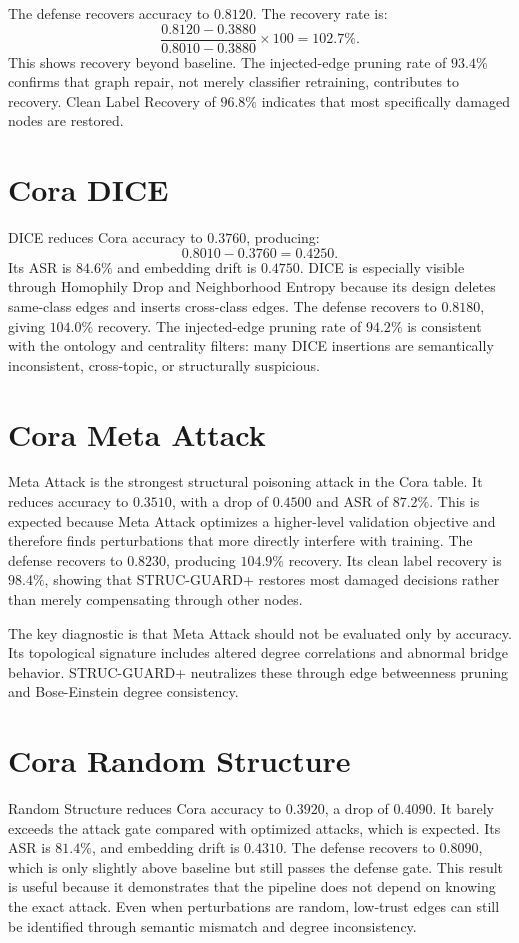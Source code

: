 \documentclass[12pt,oneside]{report}
\begin{document}
The defense recovers accuracy to $0.8120$. The recovery rate is:
$$
\frac{0.8120-0.3880}{0.8010-0.3880}\times 100=102.7\%.
$$
This shows recovery beyond baseline. The injected-edge pruning rate of $93.4\%$ confirms that graph repair, not merely classifier retraining, contributes to recovery. Clean Label Recovery of $96.8\%$ indicates that most specifically damaged nodes are restored.

\section{Cora DICE}
DICE reduces Cora accuracy to $0.3760$, producing:
$$
0.8010-0.3760=0.4250.
$$
Its ASR is $84.6\%$ and embedding drift is $0.4750$. DICE is especially visible through Homophily Drop and Neighborhood Entropy because its design deletes same-class edges and inserts cross-class edges. The defense recovers to $0.8180$, giving $104.0\%$ recovery. The injected-edge pruning rate of $94.2\%$ is consistent with the ontology and centrality filters: many DICE insertions are semantically inconsistent, cross-topic, or structurally suspicious.

\section{Cora Meta Attack}
Meta Attack is the strongest structural poisoning attack in the Cora table. It reduces accuracy to $0.3510$, with a drop of $0.4500$ and ASR of $87.2\%$. This is expected because Meta Attack optimizes a higher-level validation objective and therefore finds perturbations that more directly interfere with training. The defense recovers to $0.8230$, producing $104.9\%$ recovery. Its clean label recovery is $98.4\%$, showing that STRUC-GUARD+ restores most damaged decisions rather than merely compensating through other nodes.

The key diagnostic is that Meta Attack should not be evaluated only by accuracy. Its topological signature includes altered degree correlations and abnormal bridge behavior. STRUC-GUARD+ neutralizes these through edge betweenness pruning and Bose-Einstein degree consistency.

\section{Cora Random Structure}
Random Structure reduces Cora accuracy to $0.3920$, a drop of $0.4090$. It barely exceeds the attack gate compared with optimized attacks, which is expected. Its ASR is $81.4\%$, and embedding drift is $0.4310$. The defense recovers to $0.8090$, which is only slightly above baseline but still passes the defense gate. This result is useful because it demonstrates that the pipeline does not depend on knowing the exact attack. Even when perturbations are random, low-trust edges can still be identified through semantic mismatch and degree inconsistency.
\end{document}
